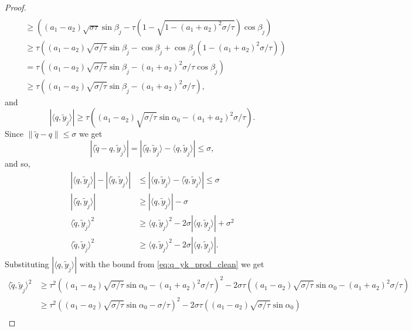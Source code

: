 \documentclass[12pt]{article}
\theoremstyle{remark}
\newcommand{\abs}[1]{\left\vert #1 \right\vert}
\newcommand{\lrangle}[1]{\langle #1 \rangle}
\begin{document}
\begin{proof}
\begin{align*}
 \\
 &\geq\left((a_1-a_2)\sqrt{\sigma\tau}\sin \beta_{\tilde j}  -  \tau\left(1-\sqrt{1- (a_1+a_2)^2\sigma/\tau} \right)\cos \beta_{\tilde j} \right)
 \\
 &\geq\tau\left((a_1-a_2)\sqrt{\sigma/\tau}\sin \beta_{\tilde j}-\cos \beta_{\tilde j} + \cos \beta_{\tilde j}(1- (a_1+a_2)^2\sigma /\tau) \right)
 \\
 &= \tau \left((a_1-a_2)\sqrt{\sigma/\tau}\sin \beta_{\tilde j} -(a_1+a_2)^2\sigma/\tau \cos\beta_{\tilde j}\right)
 \\
 &\geq \tau \left((a_1-a_2)\sqrt{\sigma/\tau}\sin \beta_{\tilde j} -(a_1+a_2)^2\sigma/\tau \right) 
,\end{align*}
and
\begin{equation}\label{eq:q_yk_prod_clean}
    |\langle q, \tilde{y}_{\tilde j} \rangle| \geq \tau \left((a_1-a_2)\sqrt{\sigma/\tau}\sin \alpha_0 -(a_1+a_2)^2\sigma/\tau \right) 
.\end{equation}
Since 
$\|\tilde{q} - q\| \leq \sigma $
we get 
$$\abs{\lrangle{\tilde q - q, \tilde y_{\tilde j}}} = |\langle \tilde{q}, \tilde{y}_{\tilde j}\rangle - \langle q, \tilde{y}_{\tilde j}\rangle| \leq\sigma,$$
and so,
\begin{align*}
|\langle q, \tilde{y}_{\tilde j}\rangle| - |\langle \tilde{q}, \tilde{y}_{\tilde j}\rangle|&\leq |\langle q, \tilde{y}_{\tilde j}\rangle - \langle \tilde{q}, \tilde{y}_{\tilde j}\rangle| \leq  \sigma\\
|\langle \tilde{q}, \tilde{y}_{\tilde j}\rangle|&\geq |\langle q, \tilde{y}_{\tilde j}\rangle| - \sigma\\
\langle \tilde{q}, \tilde{y}_{\tilde j}\rangle^2&\geq \langle q, \tilde{y}_{\tilde j}\rangle^2 - 2\sigma|\langle q, \tilde{y}_{\tilde j}\rangle| + \sigma^2\\
\langle \tilde{q}, \tilde{y}_{\tilde j}\rangle^2&\geq \langle q, \tilde{y}_{\tilde j}\rangle^2 - 2\sigma|\langle q, \tilde{y}_{\tilde j}\rangle|
.\end{align*}
 Substituting $\abs{\lrangle{q, \tilde y_{\tilde j}}}$ with the bound from \eqref{eq:q_yk_prod_clean} we get
\begin{align*}
    \lrangle{\tilde q, \tilde y_{\tilde j}}^2 & \geq \tau^2 \left((a_1-a_2)\sqrt{\sigma/\tau}\sin \alpha_0 -  (a_1+a_2)^2{\sigma/\tau}\right)^2 - 2\sigma\tau \left((a_1-a_2)\sqrt{\sigma/\tau}\sin \alpha_0 -  (a_1+a_2)^2{\sigma/\tau}\right) \\
    &\geq \tau^2\left((a_1-a_2)\sqrt{\sigma/\tau}\sin \alpha_0 -  {\sigma/\tau}\right)^2 - 2\sigma\tau \left((a_1-a_2)\sqrt{\sigma/\tau}\sin \alpha_0\right)\\

\end{align*}
\end{proof}
\end{document}
